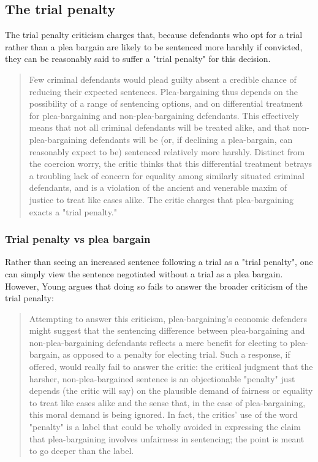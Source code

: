 \subsection{The trial penalty}

The trial penalty criticism charges that, because defendants who opt for a trial rather than a plea bargain are likely to be sentenced more harshly if convicted, they can be reasonably said to suffer a "trial penalty" for this decision. 

\begin{quote}
    Few criminal defendants would plead guilty absent a credible chance of reducing their expected sentences. Plea-bargaining thus depends on the possibility of a range of sentencing options, and on differential treatment for plea-bargaining and non-plea-bargaining defendants. This effectively means that not all criminal defendants will be treated alike, and that non-plea-bargaining defendants will be (or, if declining a plea-bargain, can reasonably expect to be) sentenced relatively more harshly. Distinct from the coercion worry, the critic thinks that this differential treatment betrays a troubling lack of concern for equality among similarly situated criminal defendants, and is a violation of the ancient and venerable maxim of justice to treat like cases alike. The critic charges that plea-bargaining exacts a "trial penalty."
\end{quote}

\subsubsection{Trial penalty vs plea bargain}

Rather than seeing an increased sentence following a trial as a "trial penalty", one can simply view the sentence negotiated without a trial as a plea bargain. However, Young argues that doing so fails to answer the broader criticism of the trial penalty:

\begin{quote}
    Attempting to answer this criticism, plea-bargaining's economic defenders might suggest that the sentencing difference between plea-bargaining and non-plea-bargaining defendants reflects a mere benefit for electing to plea-bargain, as opposed to a penalty for electing trial. Such a response, if offered, would really fail to answer the critic: the critical judgment that the harsher, non-plea-bargained sentence is an objectionable "penalty" just depends (the critic will say) on the plausible demand of fairness or equality to treat like cases alike and the sense that, in the case of plea-bargaining, this moral demand is being ignored. In fact, the critics' use of the word "penalty" is a label that could be wholly avoided in expressing the claim that plea-bargaining involves unfairness in sentencing; the point is meant to go deeper than the label.
\end{quote}

